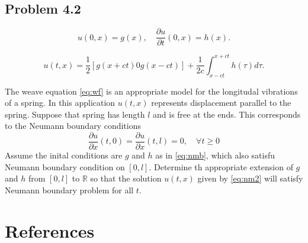 \documentclass{article}
\theoremstyle{remark}
\begin{document}
\subsection{Problem 4.2}%
\label{sub:problem_4_2}

\begin{equation}
\label{eq:nmb}
u\left( 0,x \right) = g\left( x \right) , \quad  \frac{\partial u}{\partial t}  \left( 0,x \right) = h\left( x \right) 
.\end{equation}

\begin{equation}
\label{eq:nm2}
 u\left( t,x \right) = \frac{1}{2} \left[ g\left( x + ct \right) 0 g\left( x- ct \right) \right] + \frac{1}{2c} \int_{x -ct}^{ x+ct}  h\left( \tau  \right) d\tau   
.\end{equation}


The weave equation \eqref{eq:wf} is an appropriate model for the longitudal vibrations of a spring. In this application $u\left( t,x \right)$ represents displacement parallel to the spring. Suppose that spring has length $l$ and is free at the ends. This corresponds to the Neumann boundary conditions \[
\frac{\partial u}{\partial x} \left( t, 0 \right) = \frac{\partial u}{\partial x} \left( t, l \right) = 0 , \quad  \forall t \ge 0 
\] 
Assume the inital conditions are $g$ and $h$ as in \eqref{eq:nmb}, which also satisfu Neumann boundary condition on $\left[ 0,l \right]$. Determine th appropriate  extension of $g$ and $h$ from $\left[ 0,l \right]$ to $\mathbb{R} $  so that the solution $u\left( t,x \right)$ given by \eqref{eq:nm2}  will satisfy Neumann boundary problem for all $t$.

  
  








\newpage
\section{References}%
\label{sec:references}



\end{document}
